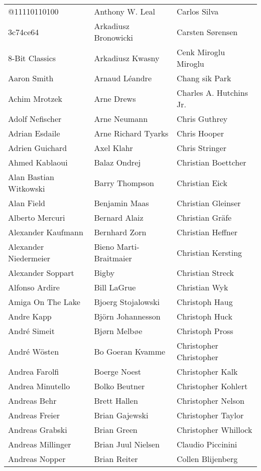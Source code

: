 \newpage
\setlength{\tabcolsep}{1mm}
\begin{tabular}{p{4.5cm}p{4.5cm}p{4.5cm}}
﻿@11110110100 & Anthony W. Leal & Carlos Silva \\
3c74ce64 & Arkadiusz Bronowicki & Carsten Sørensen \\
8-Bit Classics & Arkadiusz Kwasny & Cenk Miroglu Miroglu \\
Aaron Smith & Arnaud Léandre & Chang sik Park \\
Achim Mrotzek & Arne Drews & Charles A. Hutchins Jr. \\
Adolf Nefischer & Arne Neumann & Chris Guthrey \\
Adrian Esdaile & Arne Richard Tyarks & Chris Hooper \\
Adrien Guichard & Axel Klahr & Chris Stringer \\
Ahmed Kablaoui & Balaz Ondrej & Christian Boettcher \\
Alan Bastian Witkowski & Barry Thompson & Christian Eick \\
Alan Field & Benjamin Maas & Christian Gleinser \\
Alberto Mercuri & Bernard Alaiz & Christian Gräfe \\
Alexander Kaufmann & Bernhard Zorn & Christian Heffner \\
Alexander Niedermeier & Bieno Marti-Braitmaier & Christian Kersting \\
Alexander Soppart & Bigby & Christian Streck \\
Alfonso Ardire & Bill LaGrue & Christian Wyk \\
Amiga On The Lake & Bjoerg Stojalowski & Christoph Haug \\
Andre Kapp & Björn Johannesson & Christoph Huck \\
André Simeit & Bjørn Melbøe & Christoph Pross \\
André Wösten & Bo Goeran Kvamme & Christopher Christopher \\
Andrea Farolfi & Boerge Noest & Christopher Kalk \\
Andrea Minutello & Bolko Beutner & Christopher Kohlert \\
Andreas Behr & Brett Hallen & Christopher Nelson \\
Andreas Freier & Brian Gajewski & Christopher Taylor \\
Andreas Grabski & Brian Green & Christopher Whillock \\
Andreas Millinger & Brian Juul Nielsen & Claudio Piccinini \\
Andreas Nopper & Brian Reiter & Collen Blijenberg \\

\end{tabular}
